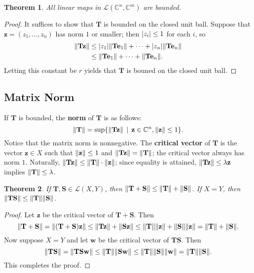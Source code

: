 \documentclass[11pt]{article}
\newtheorem{theorem}{Theorem}
\renewcommand{\vec}[1]{\mathbf{#1}}
\newcommand{\mat}[1]{\mathbf{#1}}
\begin{document}
\begin{adjustwidth}{0.5cm}{}
  \begin{theorem}
    All linear maps in $\mathcal{L}(\mathbb{C}^{n}, \mathbb{C}^{m})$ are bounded.
  \end{theorem}  
  \begin{proof}
    It suffices to show that $\mat{T}$ is bounded on the closed unit ball. Suppose that $\vec{z} = (z_{1}, \ldots, z_{n})$ has norm $1$ or smaller; then $\abs{z_{i}} \le 1$ for each $i$, so
		\begin{align*}
      \norm{\mat{T} \vec{z}} &\le \abs{z_{1}} \norm{\mat{T} \vec{e}_{1}} + \cdots + \abs{z_{n}} \norm{\mat{T} \vec{e}_{n}} \\
			&\le \norm{\mat{T} \vec{e}_{1}} + \cdots + \norm{\mat{T} \vec{e}_{n}}.
		\end{align*}
    Letting this constant be $r$ yields that $\mat{T}$ is bouned on the closed unit ball.
  \end{proof}
\end{adjustwidth}

\subsection{Matrix Norm}

If $\mat{T}$ is bounded, the \textbf{norm} of $\mat{T}$ is as follows:
\[
	\norm{\mat{T}} = \sup \{ \norm{\mat{T} \vec{z}} \, \mid \, \vec{z} \in \mathbb{C}^{n}, \norm{\vec{z}} \le 1\}.
\]
Notice that the matrix norm is nonnegative. The \textbf{critical vector} of $\mat{T}$ is the vector $\vec{z} \in X$ such that $\norm{\vec{z}} \le 1$ and $\norm{\mat{T} \vec{z}} = \norm{\mat{T}}$; the critical vector always has norm $1$. Naturally, $\norm{\mat{T} \vec{z}} \le \norm{\mat{T}} \cdot \norm{\vec{z}}$; since equality is attained, $\norm{\mat{T} \vec{z}} \le \lambda \vec{z}$ implies $\norm{\vec{T}} \le \lambda$.

\begin{theorem}
	If $\mat{T}, \mat{S} \in \mathcal{L}(X, Y)$, then $\norm{\mat{T} + \mat{S}} \le \norm{\mat{T}} + \norm{\mat{S}}$. If $X = Y$, then $\norm{\mat{TS}} \le \norm{\mat{T}} \norm{\mat{S}}$.
\end{theorem}
\begin{adjustwidth}{0.5cm}{}
	\begin{proof}
		Let $\vec{z}$ be the critical vector of $\mat{T} + \mat{S}$. Then
		\[
			\norm{\mat{T} + \mat{S}} = \norm{(\mat{T} + \mat{S})\vec{z}} \le \norm{\mat{T} \vec{z}} + \norm{\mat{S} \vec{z}} \le \norm{\mat{T}} \norm{\vec{z}} + \norm{\mat{S}} \norm{\vec{z}} = \norm{\mat{T}} + \norm{\mat{S}}.
		\]
		Now suppose $X = Y$ and let $\vec{w}$ be the critical vector of $\mat{TS}$. Then
		\[
			\norm{\mat{TS}} = \norm{\mat{TS} \vec{w}} \le \norm{\mat{T}} \norm{\mat{S} \vec{w}} \le \norm{\mat{T}} \norm{\mat{S}} \norm{\vec{w}} = \norm{\mat{T}} \norm{\mat{S}}.
		\]
		This completes the proof.
	\end{proof}
\end{adjustwidth}
\end{document}
